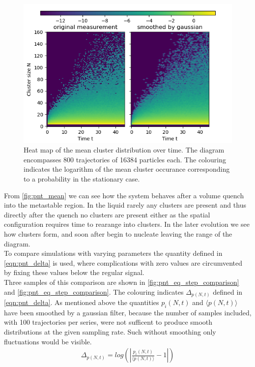 \begin{figure}[h!]
\centering
\includegraphics[width=0.7 \linewidth]{../plots/mean_pnt.png}
\caption{Heat map of the mean cluster distribution over time. The diagram encompasses 800 trajectories of 16384 particles each. The colouring indicates the logarithm of the mean cluster occurance corresponding to a probability in the stationary case.}
\label{fig:pnt_mean}
\end{figure}

From \autoref{fig:pnt_mean} we can see how the system behaves after a volume quench into the metastable region. In the liquid rarely any clusters are present and thus directly after the quench no clusters are present either as the spatial configuration requires time to rearange into clusters. In the later evolution we see how clusters form, and soon after begin to nucleate leaving the range of the diagram.\\

To compare simulations with varying parameters the quantity defined in \autoref{eqn:pnt_delta} is used, where complications with zero values are circumvented by fixing these values below the regular signal.\\ Three samples of this comparison are shown in \autoref{fig:pnt_eq_step_comparison} and \autoref{fig:pnt_eq_step_comparison}. The colouring indicates $\Delta_{p(N,t)}$ defined in \autoref{eqn:pnt_delta}. As mentioned above the quantities $p_i(N,t)$ and $\langle p(N,t) \rangle$ have been smoothed by a gaussian filter, because the number of samples included, with 100 trajectories per series, were not sufficent to produce smooth distributions at the given sampling rate. Such without smoothing only fluctuations would be visible.\\ 

\begin{align}
\label{eqn:pnt_delta}
\Delta_{p(N,t)} = log ( | \frac{p_i(N,t)}{\langle p(N,t) \rangle} -1 | )
\end{align}

